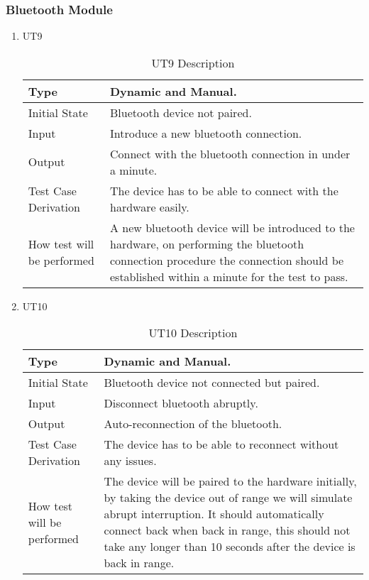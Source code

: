 \documentclass[12pt, titlepage]{article}
\begin{document}
\subsubsection{Bluetooth Module}

\begin{enumerate}

\item{UT9}
\begin{table}[H]
    \caption{UT9 Description}
\begin{tabular}{ |p{5cm}||p{7cm}| }
    \hline
    Type & Dynamic and Manual. \\
    \hline
    Initial State  &  Bluetooth device not paired. \\
    \hline
    Input &   Introduce a new bluetooth connection. \\
    \hline
    Output &   Connect with the bluetooth connection in under a minute.  \\
    \hline
    Test Case Derivation &   The device has to be able to connect with the hardware easily. \\
    \hline
    How test will be performed & A new bluetooth device will be introduced to the hardware, on performing the bluetooth connection procedure the connection should be established within a minute for the test to pass. \\
    \hline
\end{tabular}
\end{table}
\item{UT10}
\begin{table}[H]
    \caption{UT10 Description}
\begin{tabular}{ |p{5cm}||p{7cm}| }
    \hline
    Type & Dynamic and Manual. \\
    \hline
    Initial State  &  Bluetooth device not connected but paired. \\
    \hline
    Input &   Disconnect bluetooth abruptly. \\
    \hline
    Output &   Auto-reconnection of the bluetooth.  \\
    \hline
    Test Case Derivation &   The device has to be able to reconnect without any issues. \\
    \hline
    How test will be performed & The device will be paired to the hardware initially, by taking the device out of range we will simulate abrupt interruption. It should automatically connect back when back in range, this should not take any longer than 10 seconds after the device is back in range. \\
    \hline
\end{tabular}
\end{table}
\end{enumerate}
\end{document}
